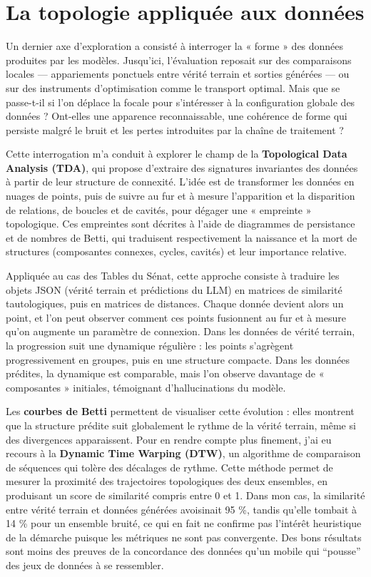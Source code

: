 \section{La topologie appliquée aux données}

Un dernier axe d’exploration a consisté à interroger la « forme » des données produites par les modèles. Jusqu’ici, l’évaluation reposait sur des comparaisons locales — appariements ponctuels entre vérité terrain et sorties générées — ou sur des instruments d’optimisation comme le transport optimal. Mais que se passe-t-il si l’on déplace la focale pour s’intéresser à la configuration globale des données ? Ont-elles une apparence reconnaissable, une cohérence de forme qui persiste malgré le bruit et les pertes introduites par la chaîne de traitement ?

Cette interrogation m’a conduit à explorer le champ de la \textbf{Topological Data Analysis (TDA)}, qui propose d’extraire des signatures invariantes des données à partir de leur structure de connexité. L’idée est de transformer les données en nuages de points, puis de suivre au fur et à mesure l’apparition et la disparition de relations, de boucles et de cavités, pour dégager une « empreinte » topologique. Ces empreintes sont décrites à l’aide de diagrammes de persistance et de nombres de Betti, qui traduisent respectivement la naissance et la mort de structures (composantes connexes, cycles, cavités) et leur importance relative.

Appliquée au cas des Tables du Sénat, cette approche consiste à traduire les objets JSON (vérité terrain et prédictions du LLM) en matrices de similarité tautologiques, puis en matrices de distances. Chaque donnée devient alors un point, et l’on peut observer comment ces points fusionnent au fur et à mesure qu’on augmente un paramètre de connexion. Dans les données de vérité terrain, la progression suit une dynamique régulière : les points s’agrègent progressivement en groupes, puis en une structure compacte. Dans les données prédites, la dynamique est comparable, mais l’on observe davantage de « composantes » initiales, témoignant d’hallucinations du modèle.

Les \textbf{courbes de Betti} permettent de visualiser cette évolution : elles montrent que la structure prédite suit globalement le rythme de la vérité terrain, même si des divergences apparaissent. Pour en rendre compte plus finement, j’ai eu recours à la \textbf{Dynamic Time Warping (DTW)}, un algorithme de comparaison de séquences qui tolère des décalages de rythme. Cette méthode permet de mesurer la proximité des trajectoires topologiques des deux ensembles, en produisant un score de similarité compris entre 0 et 1. Dans mon cas, la similarité entre vérité terrain et données générées avoisinait 95 \%, tandis qu’elle tombait à 14 \% pour un ensemble bruité, ce qui en fait ne confirme pas l’intérêt heuristique de la démarche puisque les métriques ne sont pas convergente. Des bons résultats sont moins des preuves de la concordance des données qu'un mobile qui \enquote{pousse} des jeux de données à se ressembler.

